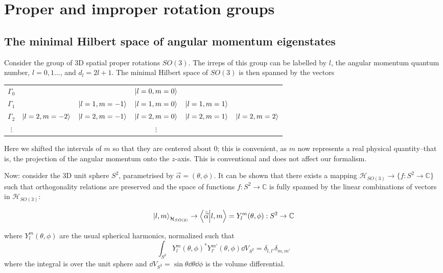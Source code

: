 \documentclass[12pt]{article}
\begin{document}
	\section{Proper and improper rotation groups}
	\subsection{The minimal Hilbert space of angular momentum eigenstates}
	
	Consider the group of 3D spatial proper rotations $SO(3)$. The irreps of this group can be labelled by $l$, the angular momentum quantum number, $l=0,1\dots$, and $d_l=2l+1$. The minimal Hilbert space of $SO(3)$ is then spanned by the vectors
	
	\begin{center}
	\begin{tabular}{c|c c c c c}
	$\Gamma_0$ & & & $\ket{l=0, m=0}$ & &\\
	$\Gamma_1$ & & $\ket{l=1,m=-1}$ & $\ket{l=1,m=0}$ & $\ket{l=1,m=1}$ & \\
	$\Gamma_2$ & $\ket{l=2,m=-2}$ & $\ket{l=2,m=-1}$ & $\ket{l=2,m=0}$ & $\ket{l=2,m=1}$ & $\ket{l=2,m=2}$\\
	$\vdots$ & & & $\vdots$ & &
	\end{tabular}
	\end{center}
	
	Here we shifted the intervals of $m$ so that they are centered about $0$; this is convenient, as $m$ now represents a real physical quantity--that is, the projection of the angular momentum onto the $z$-axis. This is conventional and does not affect our formalism.
	
	Now: consider the 3D unit sphere $S^2$, parametrised by $\vec{\alpha}=(\theta, \phi)$. It can be shown that there exists a mapping $\mathcal{H}_{SO(3)}\to \{f:S^2\to\mathbb{C}\}$ such that orthogonality relations are preserved and the space of functions $f:S^2\to\mathbb{C}$ is fully spanned by the linear combinations of vectors in $\mathcal{H}_{SO(3)}$:
	
	$$\ket{l,m}_{\mathcal{H}_{SO(3)}}\to \braket{\hat{\vec{\alpha}}}{l,m}=Y_l^m(\theta, \phi):S^2\to\mathbb{C}$$
	
	where $Y_l^m(\theta, \phi)$ are the usual spherical harmonics, normalized such that
	$$\int_{S^2}Y_l^m(\theta, \phi)^*Y_{l'}^{m'}(\theta, \phi)\dd{V}_{S^2}=\delta_{l,l'}\delta_{m,m'}$$
	where the integral is over the unit sphere and $\dd{V}_{S^2}=\sin{\theta}\dd{\theta} \dd{\phi}$ is the volume differential.
	
\end{document}
